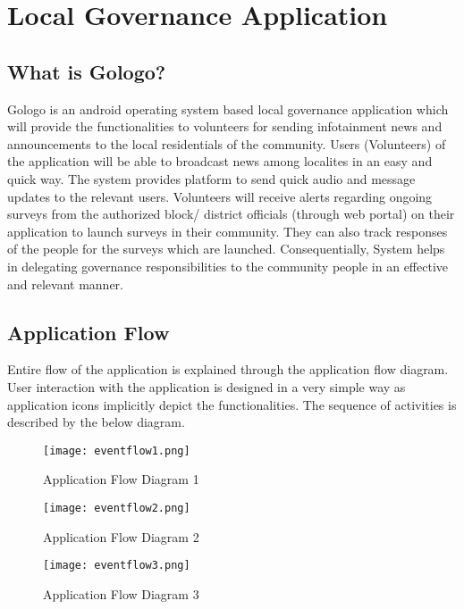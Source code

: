 \chapter {Local Governance Application}

\section{What is Gologo?}

Gologo is an android operating system based local governance application which will provide the functionalities to volunteers for sending infotainment news and announcements to the local residentials of the community. Users (Volunteers) of the application will be able to broadcast news among localites in an easy and quick way.  The system provides platform to send quick audio and message updates to the relevant users. Volunteers will receive alerts regarding ongoing surveys from the authorized block/ district officials (through web portal)  on their application to launch surveys in their community. They can also track responses of the people for the surveys which are launched. Consequentially, System helps in delegating governance responsibilities to the community people in an effective and relevant manner.

\section{Application Flow}
 Entire flow of the application is explained through the application flow diagram. User interaction with the application is designed in a very simple way as application icons implicitly depict the functionalities. The sequence of activities is described by the below diagram.

\begin{figure}[H]
    \centering
	\texttt{[image: eventflow1.png]}
    \caption{ Application Flow Diagram 1}
    \label{fig:Application Flow Diagram 1}
\end{figure} 

\begin{figure}[H]
    \centering
	\texttt{[image: eventflow2.png]}
    \caption{ Application Flow Diagram 2}
    \label{fig:Application Flow Diagram 2}
\end{figure} 

\begin{figure}[H]
    \centering
	\texttt{[image: eventflow3.png]}
    \caption{ Application Flow Diagram 3}
    \label{fig:Application Flow Diagram 3}
\end{figure} 

